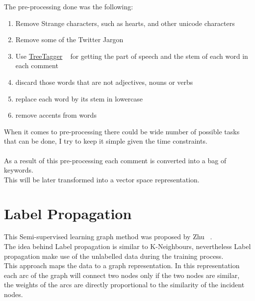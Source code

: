 \documentclass[4pt,a4paper,twocolumn]{article}
\begin{document}
The pre-processing done was the following:
\begin{enumerate}
	\item Remove Strange characters, such as hearts, and other unicode characters
	\item Remove some of the Twitter Jargon 
	\item Use \href{http://www.ims.uni-stuttgart.de/projekte/corplex/TreeTagger/}{TreeTagger} ~\cite{Schmid94probabilisticpart-of-speech} for getting the part of speech and the stem of each word in each comment
	\item discard those words that are not adjectives, nouns or verbs
	\item replace each word by its stem in lowercase
	\item remove accents from words
\end{enumerate}

When it comes to pre-processing there could be wide number of possible 
tasks that can be done, I try to keep it simple given the time constraints. \\
\\
As a result of this pre-processing each comment is converted into a bag of keywords.\\
This will be later transformed into a vector space representation.




\section{Label Propagation}

This Semi-supervised learning graph method was proposed by Zhu ~\cite{Zhu:2005:SLG:1104523}.\\
The idea behind Label propagation is similar to K-Neighbours, nevertheless Label propagation make use of the unlabelled data during the training process.\\

This approach maps the data to a graph representation.
In this representation each arc of the graph will connect two nodes only if the two nodes are similar,
the weights of the arcs are directly proportional to the similarity of the incident nodes.\\
\end{document}
